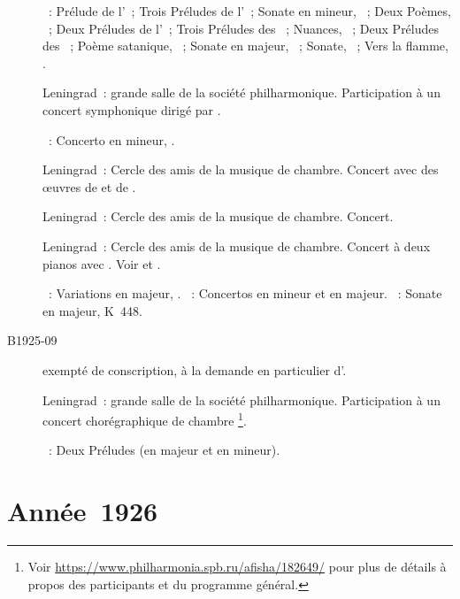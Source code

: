 \begin{description}
 \textsc{\Scriabine{}}~: Prélude de l'~; Trois Préludes de
 l'~; Sonate en \kF \Sharp mineur, ~; Deux Poèmes,
 ~; Deux Préludes de l'~; Trois Préludes des ~; Nuances,  ~; Deux Préludes des ~; Poème satanique, ~; Sonate en \kF \Sharp majeur,
 ~; Sonate, ~; Vers la flamme, .
 \item[\DateWithWeekDay{1925-07-31}]
 Leningrad~: grande salle de la société philharmonique.
 Participation à un concert symphonique dirigé par \ECooper{}.

 \textsc{\Scriabine{}}~: Concerto en \kF \Sharp mineur, .
 \item[\DateWithWeekDay{1925-09-01}]
 Leningrad~: Cercle des amis de la musique de chambre.
 Concert avec des œuvres de \Schumann{} et de \Chopin{}.
 \item[\DateWithWeekDay{1925-09-25}]
 Leningrad~: Cercle des amis de la musique de chambre.
 Concert.
 \item[\DateWithWeekDay{1925-09-29}]
 Leningrad~: Cercle des amis de la musique de chambre.
 Concert à deux pianos avec \NGolubovskaya{}.
 Voir \citet[p.~435]{Milshteyn82a} et \citet[p.~397]{Scriabine}.

 \textsc{\Schumann{}}~: Variations en \kB \Flat majeur, .
 \textsc{\JBach{}}~: Concertos en \kC mineur et en \kC majeur.
 \textsc{\Mozart{}}~: Sonate en \kD majeur, K~448.
 \item[B1925-09]
 \VSofronitsky{} exempté de conscription, à la demande en particulier
 d'\AGlazounov{}.
 \item[\DateWithWeekDay{1925-11-22}]
 Leningrad~: grande salle de la société philharmonique.
 Participation à un concert chorégraphique de chambre%
 \footnote{Voir \href{https://www.philharmonia.spb.ru/afisha/182649/}%
 {https://www.philharmonia.spb.ru/afisha/182649/} pour plus de détails à
 propos des participants et du programme général.}.

 \textsc{\Rachmaninov{}}~: Deux Préludes (en \kG majeur et en \kG mineur).
\end{description}

\section{Année~1926}

